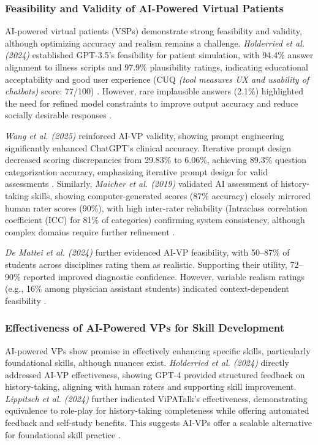 \subsubsection*{\textbf{Feasibility and Validity of AI-Powered Virtual Patients}}

AI-powered virtual patients (VSPs) demonstrate strong feasibility and validity, although optimizing accuracy and realism remains a challenge. \textit{Holderried et al. (2024)} established GPT-3.5's feasibility for patient simulation, with 94.4\% answer alignment to illness scripts and 97.9\% plausibility ratings, indicating educational acceptability and good user experience (CUQ \textit{(tool measures UX and usability of chatbots)} score: 77/100) \cite{holderried_generative_2024}. However, rare implausible answers (2.1\%) highlighted the need for refined model constraints to improve output accuracy and reduce socially desirable responses \cite{holderried_generative_2024}.

\textit{Wang et al. (2025)} reinforced AI-VP validity, showing prompt engineering significantly enhanced ChatGPT’s clinical accuracy. Iterative prompt design decreased scoring discrepancies from 29.83\% to 6.06\%, achieving 89.3\% question categorization accuracy, emphasizing iterative prompt design for valid assessments \cite{wang_application_2025}. Similarly, \textit{Maicher et al. (2019)} validated AI assessment of history-taking skills, showing computer-generated scores (87\% accuracy) closely mirrored human rater scores (90\%), with high inter-rater reliability (Intraclass correlation coefficient (ICC)  for 81\% of categories) confirming system consistency, although complex domains require further refinement \cite{maicher_using_2019}.

\textit{De Mattei et al. (2024)} further evidenced AI-VP feasibility, with 50–87\% of students across disciplines rating them as realistic. Supporting their utility, 72–90\% reported improved diagnostic confidence. However, variable realism ratings (e.g., 16\% among physician assistant students) indicated context-dependent feasibility \cite{de_mattei_are_2024}.

\subsubsection*{\textbf{Effectiveness of AI-Powered VPs for Skill Development}}

AI-powered VPs show promise in effectively enhancing specific skills, particularly foundational skills, although nuances exist. \textit{Holderried et al. (2024)} directly addressed AI-VP effectiveness, showing GPT-4 provided structured feedback on history-taking, aligning with human raters and supporting skill improvement. \textit{Lippitsch et al. (2024)} further indicated ViPATalk's effectiveness, demonstrating equivalence to role-play for history-taking completeness while offering automated feedback and self-study benefits. This suggests AI-VPs offer a scalable alternative for foundational skill practice \cite{holderried_language_2024, lippitsch_development_2024}.

